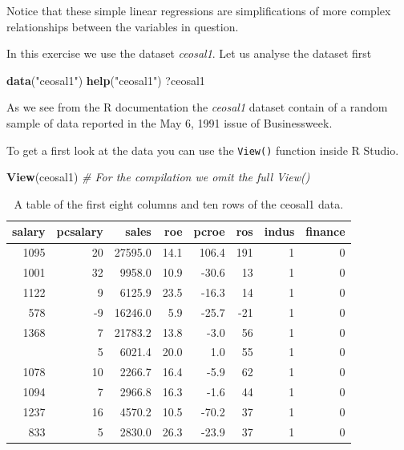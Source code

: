 \documentclass[]{book}
\newenvironment{Shaded}{\begin{snugshade}}{\end{snugshade}}
\newcommand{\CommentTok}[1]{\textcolor[rgb]{0.56,0.35,0.01}{\textit{#1}}}
\newcommand{\KeywordTok}[1]{\textcolor[rgb]{0.13,0.29,0.53}{\textbf{#1}}}
\newcommand{\NormalTok}[1]{#1}
\newcommand{\StringTok}[1]{\textcolor[rgb]{0.31,0.60,0.02}{#1}}
\begin{document}
Notice that these simple linear regressions are simplifications of
more complex relationships between the variables in question.

In this exercise we use the dataset \emph{ceosal1}. Let us analyse the dataset first

\begin{Shaded}
\begin{Highlighting}[]
\KeywordTok{data}\NormalTok{(}\StringTok{"ceosal1"}\NormalTok{)}
\KeywordTok{help}\NormalTok{(}\StringTok{"ceosal1"}\NormalTok{)}
\NormalTok{?ceosal1}
\end{Highlighting}
\end{Shaded}

As we see from the R documentation the \emph{ceosal1} dataset contain of a random sample of data reported in the May 6, 1991 issue of Businessweek.

To get a first look at the data you can use the \texttt{View()} function inside R Studio.

\begin{Shaded}
\begin{Highlighting}[]
\KeywordTok{View}\NormalTok{(ceosal1) }\CommentTok{# For the compilation we omit the full View()}
\end{Highlighting}
\end{Shaded}

\begin{table}[t]

\caption{\label{tab:unnamed-chunk-6}A table of the first eight columns and ten rows of the ceosal1 data.}
\centering
\begin{tabular}{rrrrrrrr}
\toprule
salary & pcsalary & sales & roe & pcroe & ros & indus & finance\\
\midrule
1095 & 20 & 27595.0 & 14.1 & 106.4 & 191 & 1 & 0\\
1001 & 32 & 9958.0 & 10.9 & -30.6 & 13 & 1 & 0\\
1122 & 9 & 6125.9 & 23.5 & -16.3 & 14 & 1 & 0\\
578 & -9 & 16246.0 & 5.9 & -25.7 & -21 & 1 & 0\\
1368 & 7 & 21783.2 & 13.8 & -3.0 & 56 & 1 & 0\\
\addlinespace
1145 & 5 & 6021.4 & 20.0 & 1.0 & 55 & 1 & 0\\
1078 & 10 & 2266.7 & 16.4 & -5.9 & 62 & 1 & 0\\
1094 & 7 & 2966.8 & 16.3 & -1.6 & 44 & 1 & 0\\
1237 & 16 & 4570.2 & 10.5 & -70.2 & 37 & 1 & 0\\
833 & 5 & 2830.0 & 26.3 & -23.9 & 37 & 1 & 0\\
\bottomrule
\end{tabular}
\end{table}
\end{document}

